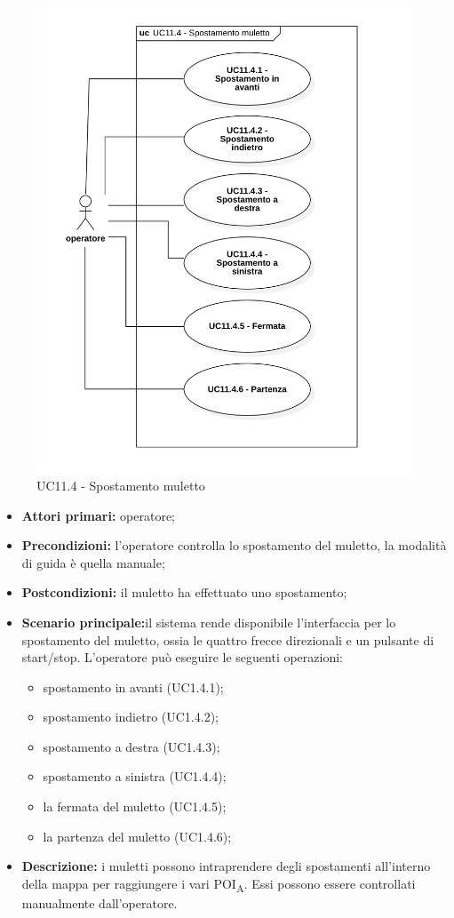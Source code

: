 \begin{figure}[H]
	\centering
	\includegraphics[scale=0.52]{res/images/uc11-4.png}
	\caption{UC11.4 - Spostamento muletto}
\end{figure}

\begin{itemize}
	\item 	\textbf{Attori primari:} operatore;
	\item 	\textbf{Precondizioni:} l’operatore controlla lo spostamento del muletto, la modalità di guida è quella manuale;
	\item 	\textbf{Postcondizioni:} il muletto ha effettuato uno spostamento;
	\item 	\textbf{Scenario principale:}il sistema rende disponibile l’interfaccia per lo spostamento del muletto, ossia le quattro frecce direzionali e un pulsante di start/stop. L’operatore può eseguire le seguenti operazioni:
	\begin{itemize}
		\item spostamento in avanti (UC1.4.1); 
		\item spostamento indietro (UC1.4.2);
		\item spostamento a destra (UC1.4.3);
		\item spostamento a sinistra (UC1.4.4);
		\item la fermata del muletto (UC1.4.5);
		\item la partenza del muletto (UC1.4.6);
	\end{itemize}
	\item 	\textbf{Descrizione:} i muletti possono intraprendere degli spostamenti all’interno della mappa per raggiungere i vari \acrshort{POI}\textsubscript{A}. Essi possono essere controllati manualmente dall’operatore.
\end{itemize}


